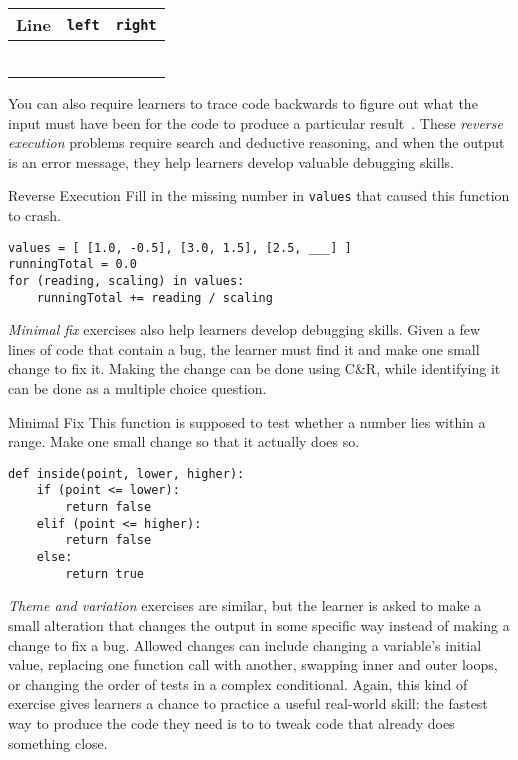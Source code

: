 \begin{center}
\begin{tabular}{|l|l|l|}
  \hline
  Line & \texttt{left} & \texttt{right} \\
  \hline
  & & \\
  \hline
  & & \\
  \hline
  & & \\
  \hline
  & & \\
  \hline
  & & \\
  \hline
  & & \\
  \hline
\end{tabular}
\end{center}

You can also require learners to trace code backwards
to figure out what the input must have been
for the code to produce a particular result~\cite{Armo2008}.
These \emph{reverse execution} problems require search and deductive reasoning,
and when the output is an error message,
they help learners develop valuable debugging skills.

\begin{aside}{Reverse Execution}
  Fill in the missing number in \texttt{values}
  that caused this function to crash.

\begin{verbatim}
values = [ [1.0, -0.5], [3.0, 1.5], [2.5, ___] ]
runningTotal = 0.0
for (reading, scaling) in values:
    runningTotal += reading / scaling
\end{verbatim}
\end{aside}

\emph{Minimal fix} exercises also help learners develop debugging skills.
Given a few lines of code that contain a bug,
the learner must find it and make one small change to fix it.
Making the change can be done using C\&R,
while identifying it can be done as a multiple choice question.

\begin{aside}{Minimal Fix}
  This function is supposed to test
  whether a number lies within a range.
  Make one small change so that it actually does so.

\begin{verbatim}
def inside(point, lower, higher):
    if (point <= lower):
        return false
    elif (point <= higher):
        return false
    else:
        return true
\end{verbatim}
\end{aside}

\emph{Theme and variation} exercises are similar,
but the learner is asked to make a small alteration that changes the output in some specific way
instead of making a change to fix a bug.
Allowed changes can include changing a variable's initial value,
replacing one function call with another,
swapping inner and outer loops,
or changing the order of tests in a complex conditional.
Again,
this kind of exercise gives learners a chance to practice a useful real-world skill:
the fastest way to produce the code they need
is to to tweak code that already does something close.

